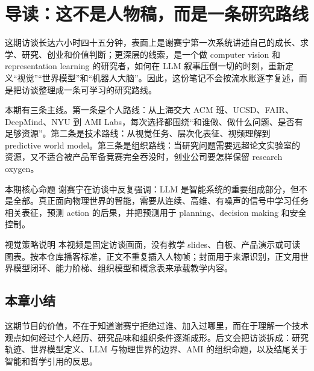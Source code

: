 \section{导读：这不是人物稿，而是一条研究路线}

这期访谈长达六小时四十五分钟，表面上是谢赛宁第一次系统讲述自己的成长、求学、研究、创业和价值判断；更深层的线索，是一个做 computer vision 和 representation learning 的研究者，如何在 LLM 叙事压倒一切的时刻，重新定义“视觉”“世界模型”和“机器人大脑”。因此，这份笔记不会按流水账逐字复述，而是把访谈整理成一条可学习的研究路线。

本期有三条主线。第一条是个人路线：从上海交大 ACM 班、UCSD、FAIR、DeepMind、NYU 到 AMI Labs，每次选择都围绕“和谁做、做什么问题、是否有足够资源”。第二条是技术路线：从视觉任务、层次化表征、视频理解到 predictive world model。第三条是组织路线：当研究问题需要远超论文实验室的资源，又不适合被产品军备竞赛完全吞没时，创业公司要怎样保留 research oxygen。

\begin{importantbox}{本期核心命题}
谢赛宁在访谈中反复强调：LLM 是智能系统的重要组成部分，但不是全部。真正面向物理世界的智能，需要从连续、高维、有噪声的信号中学习任务相关表征，预测 action 的后果，并把预测用于 planning、decision making 和安全控制。
\end{importantbox}

\begin{knowledgebox}{视觉策略说明}
本视频是固定访谈画面，没有教学 slides、白板、产品演示或可读图表。按本仓库播客标准，正文不重复插入人物帧；封面用于来源识别，正文用世界模型闭环、能力阶梯、组织模型和概念表来承载教学内容。
\end{knowledgebox}

\subsection{本章小结}

这期节目的价值，不在于知道谢赛宁拒绝过谁、加入过哪里，而在于理解一个技术观点如何经过个人经历、研究品味和组织条件逐渐成形。后文会把访谈拆成：研究轨迹、世界模型定义、LLM 与物理世界的边界、AMI 的组织命题，以及结尾关于智能和哲学引用的反思。

